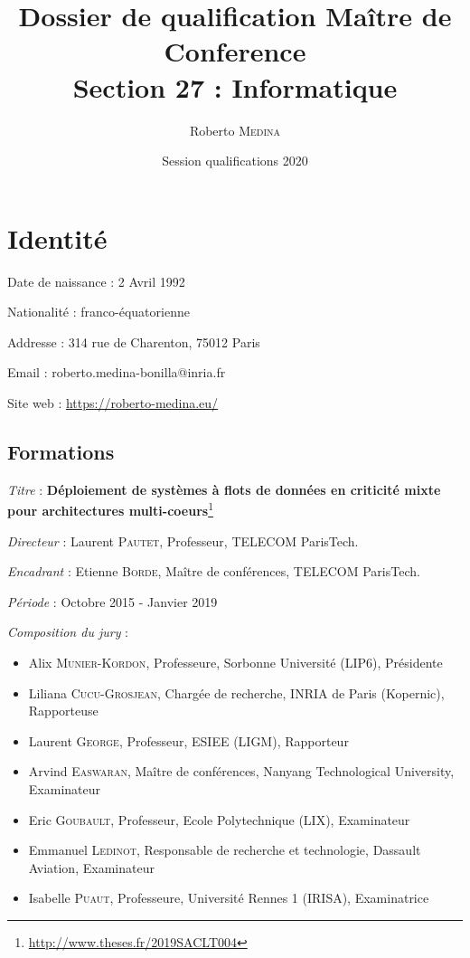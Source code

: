 \documentclass{article}
\title{Dossier de qualification Maître de Conference \\ Section 27 : Informatique} %
\author{Roberto \textsc{Medina}} %
\date{Session qualifications 2020} %
\begin{document}
\maketitle %


\section{Identité}

Date de naissance : 2 Avril 1992

Nationalité : franco-équatorienne


Addresse : 314 rue de Charenton, 75012 Paris

Email : roberto.medina-bonilla@inria.fr

Site web : \url{https://roberto-medina.eu/}

\subsection{Formations}

\begin{center}
\end{center}

\textit{Titre} :\textbf{ Déploiement de systèmes à flots de données en criticité mixte pour architectures 
multi-coeurs}\footnote{\url{http://www.theses.fr/2019SACLT004}}

\textit{Directeur} : Laurent \textsc{Pautet}, Professeur, TELECOM ParisTech.

\textit{Encadrant} : Etienne \textsc{Borde}, Maître de conférences, TELECOM ParisTech.

\textit{Période} : Octobre 2015 - Janvier 2019

\textit{Composition du jury} :
\begin{itemize}
	\item Alix \textsc{Munier-Kordon}, Professeure, Sorbonne Université (LIP6), Présidente
	\item Liliana \textsc{Cucu-Grosjean}, Chargée de recherche, INRIA de Paris (Kopernic), Rapporteuse
	\item Laurent \textsc{George}, Professeur, ESIEE (LIGM), Rapporteur
	\item Arvind \textsc{Easwaran}, Maître de conférences, Nanyang Technological University, Examinateur
	\item Eric \textsc{Goubault}, Professeur, Ecole Polytechnique (LIX), Examinateur
	\item Emmanuel \textsc{Ledinot}, Responsable de recherche et technologie, Dassault Aviation, 
	Examinateur
	\item Isabelle \textsc{Puaut}, Professeure, Université Rennes 1 (IRISA), Examinatrice
\end{itemize}
\end{document}
